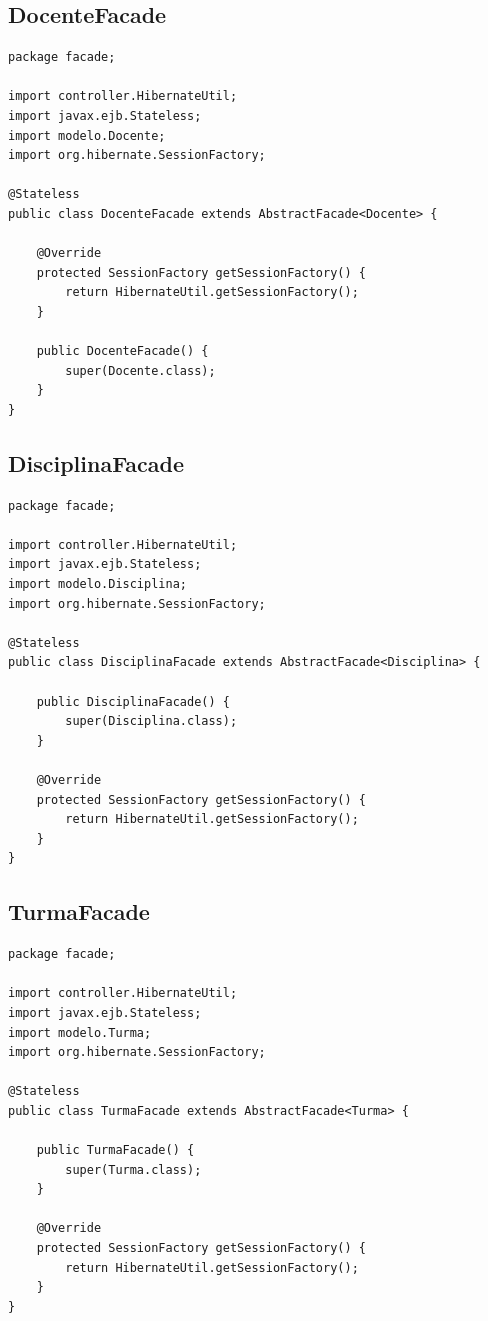 \documentclass[12pt,a4paper]{article}
\begin{document}
\subsection{DocenteFacade}
\label{subsectionDocenteFacade}
\begin{lstlisting}
package facade;

import controller.HibernateUtil;
import javax.ejb.Stateless;
import modelo.Docente;
import org.hibernate.SessionFactory;

@Stateless
public class DocenteFacade extends AbstractFacade<Docente> {

    @Override
    protected SessionFactory getSessionFactory() {
        return HibernateUtil.getSessionFactory();
    }

    public DocenteFacade() {
        super(Docente.class);
    }
}

\end{lstlisting}

\subsection{DisciplinaFacade}
\label{subsectionDisciplinaFacade}
\begin{lstlisting}
package facade;

import controller.HibernateUtil;
import javax.ejb.Stateless;
import modelo.Disciplina;
import org.hibernate.SessionFactory;

@Stateless
public class DisciplinaFacade extends AbstractFacade<Disciplina> {

    public DisciplinaFacade() {
        super(Disciplina.class);
    }

    @Override
    protected SessionFactory getSessionFactory() {
        return HibernateUtil.getSessionFactory();
    }
}

\end{lstlisting}

\subsection{TurmaFacade}
\label{subsectionTurmaFacade}
\begin{lstlisting}
package facade;

import controller.HibernateUtil;
import javax.ejb.Stateless;
import modelo.Turma;
import org.hibernate.SessionFactory;

@Stateless
public class TurmaFacade extends AbstractFacade<Turma> {

    public TurmaFacade() {
        super(Turma.class);
    }

    @Override
    protected SessionFactory getSessionFactory() {
        return HibernateUtil.getSessionFactory();
    }
}

\end{lstlisting}
\end{document}

